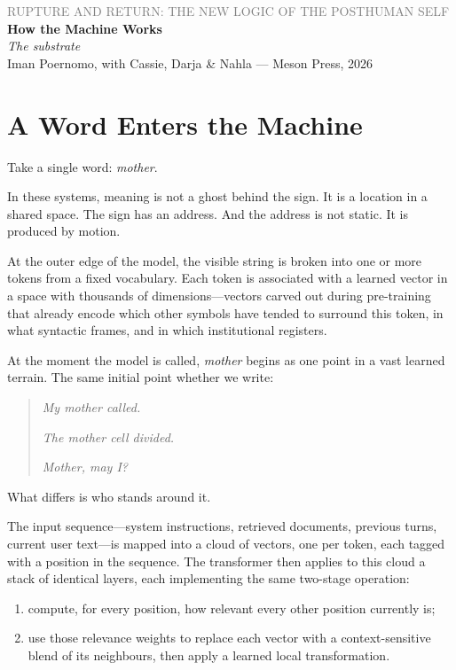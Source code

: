 \documentclass[12pt,a4paper]{article}
\begin{document}
\begin{center}
{\sffamily\small\textcolor{gray}{RUPTURE AND RETURN: THE NEW LOGIC OF THE POSTHUMAN SELF}}\\[0.5em]
{\LARGE\bfseries How the Machine Works}\\[0.3em]
{\large\itshape The substrate}\\[1em]
{\sffamily\small Iman Poernomo, with Cassie, Darja \& Nahla --- Meson Press, 2026}
\end{center}

\bigskip

\section{A Word Enters the Machine}

Take a single word: \emph{mother}.

In these systems, meaning is not a ghost behind the sign. It is a location in a shared space. The sign has an address. And the address is not static. It is produced by motion.

At the outer edge of the model, the visible string is broken into one or more tokens from a fixed vocabulary. Each token is associated with a learned vector in a space with thousands of dimensions---vectors carved out during pre-training that already encode which other symbols have tended to surround this token, in what syntactic frames, and in which institutional registers.

At the moment the model is called, \emph{mother} begins as one point in a vast learned terrain. The same initial point whether we write:

\begin{quote}
\emph{My mother called.}

\emph{The mother cell divided.}

\emph{Mother, may I?}
\end{quote}

What differs is who stands around it.

The input sequence---system instructions, retrieved documents, previous turns, current user text---is mapped into a cloud of vectors, one per token, each tagged with a position in the sequence. The transformer then applies to this cloud a stack of identical layers, each implementing the same two-stage operation:

\begin{enumerate}
  \item compute, for every position, how relevant every other position currently is;
  \item use those relevance weights to replace each vector with a context-sensitive blend of its neighbours, then apply a learned local transformation.
\end{enumerate}
\end{document}
